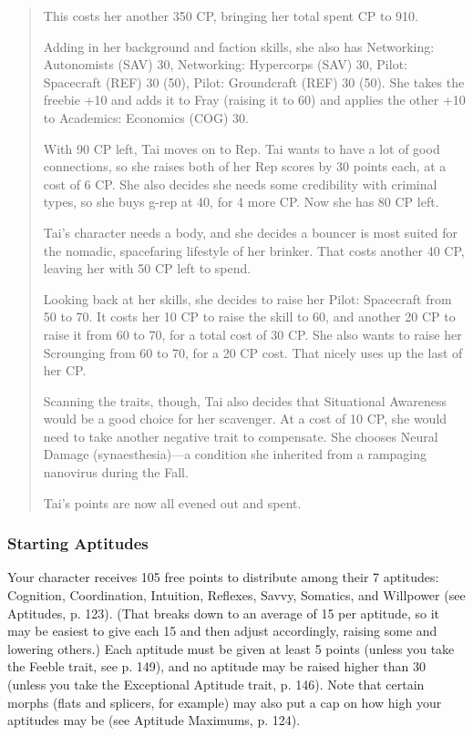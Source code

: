 \begin{quotation}
This costs her another 350 CP, bringing her total spent CP to 910. 

Adding in her background and faction skills, she also has Networking: Autonomists (SAV) 30, Networking: Hypercorps (SAV) 30, Pilot: Spacecraft (REF) 30 (50), Pilot: Groundcraft (REF) 30 (50). She takes the freebie +10 and adds it to Fray (raising it to 60) and applies the other +10 to Academics: Economics (COG) 30. 

With 90 CP left, Tai moves on to Rep. Tai wants to have a lot of good connections, so she raises both of her Rep scores by 30 points each, at a cost of 6 CP. She also decides she needs some credibility with criminal types, so she buys g-rep at 40, for 4 more CP. Now she has 80 CP left. 

Tai’s character needs a body, and she decides a bouncer is most suited for the nomadic, spacefaring lifestyle of her brinker. That costs another 40 CP, leaving her with 50 CP left to spend. 

Looking back at her skills, she decides to raise her Pilot: Spacecraft from 50 to 70. It costs her 10 CP to raise the skill to 60, and another 20 CP to raise it from 60 to 70, for a total cost of 30 CP. She also wants to raise her Scrounging from 60 to 70, for a 20 CP cost. That nicely uses up the last of her CP. 

Scanning the traits, though, Tai also decides that Situational Awareness would be a good choice for her scavenger. At a cost of 10 CP, she would need to take another negative trait to compensate. She chooses Neural Damage (synaesthesia)—a condition she inherited from a rampaging nanovirus during the Fall. 

Tai’s points are now all evened out and spent. \end{quotation} 

\subsubsection{Starting Aptitudes} \label{sec:starting-aptitudes} 

Your character receives 105 free points to distribute among their 7 aptitudes: Cognition, Coordination, Intuition, Reflexes, Savvy, Somatics, and Willpower (see Aptitudes, p. 123). (That breaks down to an average of 15 per aptitude, so it may be easiest to give each 15 and then adjust accordingly, raising some and lowering others.) Each aptitude must be given at least 5 points (unless you take the Feeble trait, see p. 149), and no aptitude may be raised higher than 30 (unless you take the Exceptional Aptitude trait, p. 146). Note that certain morphs (flats and splicers, for example) may also put a cap on how high your aptitudes may be (see Aptitude Maximums, p. 124). 

